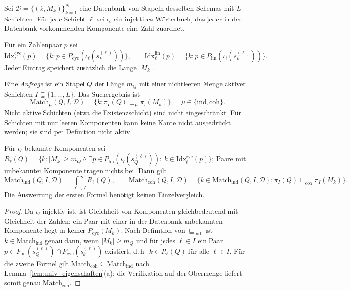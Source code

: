 Sei $\mathcal{D}=\{(k,M_k)\}_{k=1}^{N}$ eine Datenbank von Stapeln desselben Schemas mit $L$ Schichten. Für jede Schicht $\ell$ sei $\iota_\ell$ ein injektives Wörterbuch, das jeder in der Datenbank vorkommenden Komponente eine Zahl zuordnet.

\begin{definition}[Paarindex]
	Für ein Zahlenpaar $p$ sei
	\[
	\mathrm{Idx}^{\mathrm{cyc}}_\ell(p)=\{k : p\in P_{\mathrm{cyc}}(\iota_\ell(s_k^{(\ell)}))\},\qquad
	\mathrm{Idx}^{\mathrm{lin}}_\ell(p)=\{k : p\in P_{\mathrm{lin}}(\iota_\ell(s_k^{(\ell)}))\}.
	\]
	Jeder Eintrag speichert zusätzlich die Länge $|M_k|$.
\end{definition}

\begin{definition}
	Eine \emph{Anfrage} ist ein Stapel $Q$ der Länge $m_Q$ mit einer nichtleeren Menge aktiver Schichten $I\subseteq\{1,\dots,L\}$. Das Suchergebnis ist
	\[
	\mathrm{Match}_\mu(Q,I,\mathcal{D})=\{k : \pi_I(Q)\sqsubseteq_\mu\pi_I(M_k)\},\quad \mu\in\{\mathrm{ind},\mathrm{coh}\}.
	\]
	Nicht aktive Schichten (etwa die Existenzschicht) sind nicht eingeschränkt. Für Schichten mit nur leeren Komponenten kann \glqq keine Kante\grqq{} nicht ausgedrückt werden; sie sind per Definition nicht aktiv.
\end{definition}

\begin{satz}
	\label{satz:univ_index}
	Für $\iota_\ell$-bekannte Komponenten sei $R_\ell(Q)=\{k : |M_k|\ge m_Q \wedge \exists p\in P_{\mathrm{lin}}(\iota_\ell(s_Q^{(\ell)})):\ k\in\mathrm{Idx}^{\mathrm{cyc}}_\ell(p)\}$; Paare mit unbekannter Komponente tragen nichts bei. Dann gilt
	\[
	\mathrm{Match}_{\mathrm{ind}}(Q,I,\mathcal{D})=\bigcap_{\ell\in I}R_\ell(Q),
	\qquad
	\mathrm{Match}_{\mathrm{coh}}(Q,I,\mathcal{D})=\{k\in\mathrm{Match}_{\mathrm{ind}}(Q,I,\mathcal{D}) : \pi_I(Q)\sqsubseteq_{\mathrm{coh}}\pi_I(M_k)\}.
	\]
	Die Auswertung der ersten Formel benötigt keinen Einzelvergleich.
\end{satz}

\begin{proof}
	Da $\iota_\ell$ injektiv ist, ist Gleichheit von Komponenten gleichbedeutend mit Gleichheit der Zahlen; ein Paar mit einer in der Datenbank unbekannten Komponente liegt in keiner $P_{\mathrm{cyc}}(M_k)$. Nach Definition von $\sqsubseteq_{\mathrm{ind}}$ ist $k\in\mathrm{Match}_{\mathrm{ind}}$ genau dann, wenn $|M_k|\ge m_Q$ und für jedes $\ell\in I$ ein Paar $p\in P_{\mathrm{lin}}(s_Q^{(\ell)})\cap P_{\mathrm{cyc}}(s_k^{(\ell)})$ existiert, d.\,h.\ $k\in R_\ell(Q)$ für alle $\ell\in I$. Für die zweite Formel gilt $\mathrm{Match}_{\mathrm{coh}}\subseteq\mathrm{Match}_{\mathrm{ind}}$ nach Lemma~\ref{lem:univ_eigenschaften}(a); die Verifikation auf der Obermenge liefert somit genau $\mathrm{Match}_{\mathrm{coh}}$.
\end{proof}


